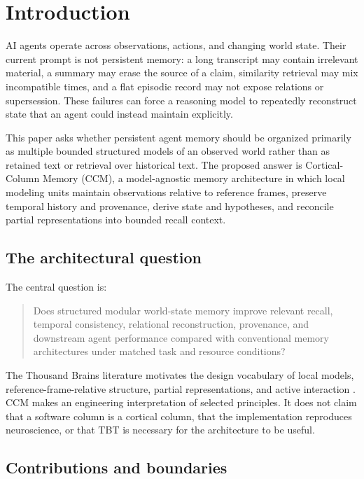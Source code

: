 \section{Introduction}

AI agents operate across observations, actions, and changing world state. Their current prompt is not persistent memory: a long transcript may contain irrelevant material, a summary may erase the source of a claim, similarity retrieval may mix incompatible times, and a flat episodic record may not expose relations or supersession. These failures can force a reasoning model to repeatedly reconstruct state that an agent could instead maintain explicitly.

This paper asks whether persistent agent memory should be organized primarily as multiple bounded structured models of an observed world rather than as retained text or retrieval over historical text. The proposed answer is Cortical-Column Memory (CCM), a model-agnostic memory architecture in which local modeling units maintain observations relative to reference frames, preserve temporal history and provenance, derive state and hypotheses, and reconcile partial representations into bounded recall context.

\subsection{The architectural question}

The central question is:

\begin{quote}
Does structured modular world-state memory improve relevant recall, temporal consistency, relational reconstruction, provenance, and downstream agent performance compared with conventional memory architectures under matched task and resource conditions?
\end{quote}

The Thousand Brains literature motivates the design vocabulary of local models, reference-frame-relative structure, partial representations, and active interaction \citep{hawkins2017columns,hawkins2019framework}. CCM makes an engineering interpretation of selected principles. It does not claim that a software column is a cortical column, that the implementation reproduces neuroscience, or that TBT is necessary for the architecture to be useful.

\subsection{Contributions and boundaries}

